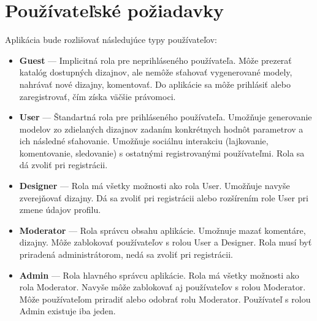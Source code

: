 \documentclass[a4paper]{article}
\begin{document}
\section{Používateľské požiadavky}

Aplikácia bude rozlišovať následujúce typy používateľov:
\begin{itemize}
    \item \textbf{Guest} ---
        Implicitná rola pre neprihláseného používateľa.
        Môže prezerať katalóg dostupných dizajnov, 
        ale nemôže sťahovať vygenerované modely, 
        nahrávať nové dizajny, komentovať.
        Do aplikácie sa môže prihlásiť alebo zaregistrovať,
        čím získa väčšie právomoci.
    \item \textbf{User} ---
        Štandartná rola pre prihláseného používateľa.
        Umožňuje generovanie modelov zo zdielaných dizajnov 
        zadaním konkrétnych hodnôt parametrov a ich následné sťahovanie.
        Umožňuje sociálnu interakciu (lajkovanie, komentovanie, sledovanie) 
        s ostatnými registrovanými používateľmi.
        Rola sa dá zvoliť pri registrácii.
    \item \textbf{Designer} ---
        Rola má všetky možnosti ako rola User.
        Umožňuje navyše zverejňovať dizajny.
        Dá sa zvoliť pri registrácii alebo rozšírením role User
        pri zmene údajov profilu.
    \item \textbf{Moderator} ---
        Rola správcu obsahu aplikácie.
        Umožnuje mazať komentáre, dizajny.
        Môže zablokovať používateľov s rolou User a Designer.
        Rola musí byť priradená administrátorom, nedá sa zvoliť pri registrácii.
    \item \textbf{Admin} ---
        Rola hlavného správcu aplikácie.
        Rola má všetky možnosti ako rola Moderator.
        Navyše môže zablokovať aj používateľov s rolou Moderator.
        Môže používateľom priradiť alebo odobrať rolu Moderator.
        Používateľ s rolou Admin existuje iba jeden.
\end{itemize}
\end{document}
